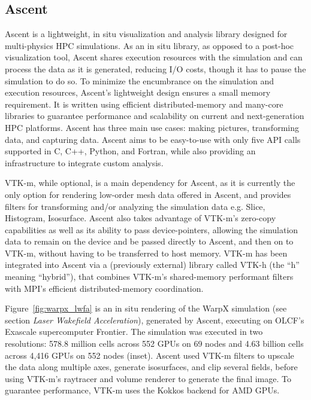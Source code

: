 \subsection{Ascent}
Ascent is a lightweight, in situ visualization and analysis library designed for multi-physics HPC simulations. As an in situ library, as opposed to a post-hoc visualization tool, Ascent shares execution resources with the simulation and can process the data as it is generated, reducing I/O costs, though it has to pause the simulation to do so. To minimize the encumbrance on the simulation and execution resources, Ascent's lightweight design ensures a small memory requirement. It is written using efficient distributed-memory and many-core libraries to guarantee performance and scalability on current and next-generation HPC platforms. Ascent has three main use cases: making pictures, transforming data, and capturing data. Ascent aims to be easy-to-use with only five API calls supported in C, C++, Python, and Fortran, while also providing an infrastructure to integrate custom analysis.

VTK-m, while optional, is a main dependency for Ascent, as it is currently the only option for rendering low-order mesh data offered in Ascent, and provides filters for transforming and/or analyzing the simulation data e.g. Slice, Histogram, Isosurface. Ascent also takes advantage of VTK-m's zero-copy capabilities as well as its ability to pass device-pointers, allowing the simulation data to remain on the device and be passed directly to Ascent, and then on to VTK-m, without having to be transferred to host memory. VTK-m has been integrated into Ascent via a (previously external) library called VTK-h (the ``h'' meaning ``hybrid''), that combines VTK-m's shared-memory performant filters with MPI's efficient distributed-memory coordination. 

Figure~\ref{fig:warpx_lwfa} is an in situ rendering of the WarpX simulation (see section \textit{Laser Wakefield Acceleration}), generated by Ascent, executing on OLCF's Exascale supercomputer Frontier.
The simulation was executed in two resolutions: 578.8 million cells across 552 GPUs on 69 nodes and 4.63 billion cells across 4,416 GPUs on 552 nodes (inset).
Ascent used VTK-m filters to upscale the data along multiple axes, generate isosurfaces, and clip several fields, before using VTK-m's raytracer and volume renderer to generate the final image.
To guarantee performance, VTK-m uses the Kokkos backend for AMD GPUs. 

